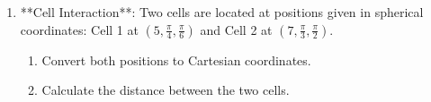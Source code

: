 \documentclass[11pt]{article}
\begin{document}
\begin{enumerate}
    \item **Cell Interaction**: Two cells are located at positions given in spherical coordinates: Cell 1 at \( (5, \frac{\pi}{4}, \frac{\pi}{6}) \) and Cell 2 at \( (7, \frac{\pi}{3}, \frac{\pi}{2}) \). 
    \begin{enumerate}
        \item Convert both positions to Cartesian coordinates.
        \item Calculate the distance between the two cells.
    \end{enumerate}

\end{enumerate}
\end{document}
